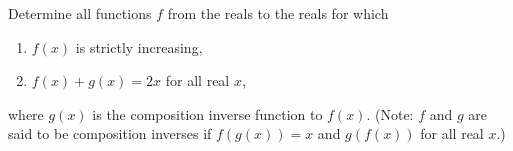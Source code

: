 Determine all functions $f$ from the reals to the reals for which
\begin{enumerate}[label=(\alph*)]
	\item $f\left(x\right)$ is strictly increasing,
	\item $f\left(x\right)+g\left(x\right)=2x$ for all real $x$,
\end{enumerate}
where $g\left(x\right)$ is the composition inverse function to $f\left(x\right)$. (Note: $f$ and $g$ are said to be composition inverses if $f\left(g\left(x\right)\right)=x$ and $g\left(f\left(x\right)\right)$ for all real $x$.)
